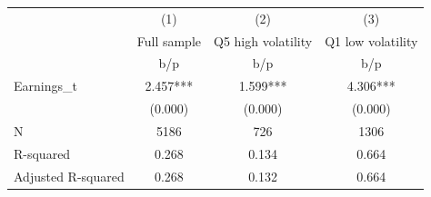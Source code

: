 {
\def\sym#1{\ifmmode^{#1}\else\(^{#1}\)\fi}
\begin{tabular}{l*{3}{c}}
\hline\hline
                    &\multicolumn{1}{c}{(1)}&\multicolumn{1}{c}{(2)}&\multicolumn{1}{c}{(3)}\\
                    &\multicolumn{1}{c}{Full sample}&\multicolumn{1}{c}{Q5 high volatility}&\multicolumn{1}{c}{Q1 low volatility}\\
                    &         b/p   &         b/p   &         b/p   \\
\hline
Earnings\_t          &       2.457***&       1.599***&       4.306***\\
                    &     (0.000)   &     (0.000)   &     (0.000)   \\
\hline
N                   &        5186   &         726   &        1306   \\
R-squared           &       0.268   &       0.134   &       0.664   \\
Adjusted R-squared  &       0.268   &       0.132   &       0.664   \\
\hline\hline
\end{tabular}
}
